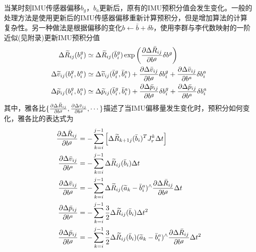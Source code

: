 当某时刻IMU传感器偏移$b_g$，$b_a$更新后，原有的IMU预积分值会发生变化。一般的处理方法是使用更新后的IMU传感器偏移重新计算预积分，但是增加算法的计算复杂性。另一种做法是根据偏移的变化$b \leftarrow \bar{b}+\delta b$，使用李群与李代数映射的一阶近似(见附录)更新IMU预积分值
\begin{equation}
\label{equ5.25}
\begin{aligned}
\Delta \widetilde{R}_{ij}(b_i^g) &\simeq  \Delta \widetilde{R}_{ij}(\bar{b}_i^g) \exp \left( { \partial \Delta \bar{R}_{ij} \over \partial b^g } \delta b^g \right) \\
\Delta \widetilde{v}_{ij}(b_i^g,b_i^a) &\simeq \Delta \widetilde{v}_{ij}(\bar{b}_i^g,\bar{b}_i^a) + { \partial \Delta \bar{v}_{ij} \over \partial b^g } \delta b_i^g + { \partial \Delta \bar{v}_{ij} \over \partial b^a } \delta b_i^a 				\\
\Delta \widetilde{p}_{ij}(b_i^g,b_i^a) &\simeq \Delta \widetilde{p}_{ij}(\bar{b}_i^g,\bar{b}_i^a) + { \partial \Delta \bar{p}_{ij} \over \partial b^g } \delta b_i^g + { \partial \Delta \bar{p}_{ij} \over \partial b^a } \delta b_i^a 	
\end{aligned}
\end{equation}
其中，雅各比$\{ { \partial \Delta \bar{R}_{ij} \over \partial b^g },{ \partial \Delta \bar{v}_{ij} \over \partial b^g }, \cdots \} $描述了当IMU偏移量发生变化时，预积分如何变化，雅各比的表达式为
\begin{equation}
\label{equ5.26}
\begin{aligned}
{\partial \Delta \bar{R}_{ij} \over \partial b^g } &= - \sum\limits_{k=i}^{j-1} \left[  \Delta \widetilde{R}_{k+1j}(\bar{b}_i)^T J_r^k \Delta t \right] \\ 
{\partial \Delta \bar{v}_{ij} \over \partial b^a } &= -\sum\limits_{k=i}^{j-1} \Delta \widetilde{R}_{ij}(\bar{b}_i) \Delta t	\\
{\partial \Delta \bar{v}_{ij} \over \partial b^g } &= -\sum\limits_{k=i}^{j-1} \Delta \widetilde{R}_{ij}(\widetilde{a}_k - \bar{b}_i^a)^{\wedge} {\partial \Delta \bar{R}_{ij} \over \partial b^g } \Delta t	\\
{\partial \Delta \bar{p}_{ij} \over \partial b^a } &= -\sum\limits_{k=i}^{j-1} {3 \over 2} \Delta \widetilde{R}_{ij}(\bar{b}_i) \Delta t^2 \\
{\partial \Delta \bar{p}_{ij} \over \partial b^g } &= -\sum\limits_{k=i}^{j-1} {3 \over 2} \Delta \widetilde{R}_{ij}(\bar{b}_i) (\widetilde{a}_k - \bar{b}_i^a)^{\wedge} {\partial \Delta \bar{R}_{ij} \over \partial b^g } \Delta t^2
\end{aligned}
\end{equation}

